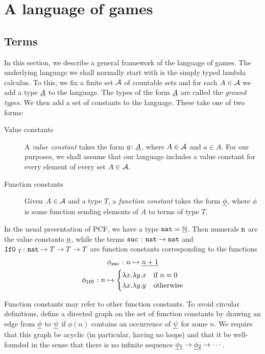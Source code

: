 \documentclass{article}
\begin{document}
\section{A language of games}
\label{sec:game-language}

\subsection{Terms}

In this section, we describe a general framework of the language of games.  
The underlying language we shall normally start with is the simply typed lambda calculus.  
To this, we fix a finite set ${\mathcal{A}}$ of countable sets and for each $A\in{\mathcal{A}}$ we add a type ${\underline{A}}$ to the language.  The types of the form ${\underline{A}}$ are called the \emph{ground types}.
We then add a set of constants to the language.  These take one of two forms:
\begin{description}
  \item[Value constants] A \emph{value constant} takes the form ${\underline{a}}\colon{\underline{A}}$, where $A\in{\mathcal{A}}$ and $a\in A$.  For our purposes, we shall assume that our language includes a value constant for every element of every set $A\in{\mathcal{A}}$.
  \item[Function constants] Given $A\in{\mathcal{A}}$ and a type $T$, a \emph{function constant} takes the form ${\underline{\phi}}$, where $\phi$ is some function sending elements of $A$ to terms of type $T$.
\end{description}

\begin{example}
  In the usual presentation of PCF, we have a type ${\mathtt{nat}}={\underline{\mathbb{N}}}$.  Then numerals ${\mathtt{n}}$ are the value constants ${\underline{n}}$, while the terms ${\mathtt{suc\;}}\colon{\mathtt{nat}}\to{\mathtt{nat}}$ and ${\mathtt{If0}\;}_T\colon{\mathtt{nat}}\to T\to T\to T$ are function constants corresponding to the functions
  \begin{gather*}
    \phi_{\mathtt{suc\;}} \colon n \mapsto {\underline{n + 1}} \\
    \phi_{{\mathtt{If0}\;}} \colon n \mapsto \begin{cases}
      \lambda x . \lambda y . x & \text{if $n=0$} \\
      \lambda x . \lambda y . y & \text{otherwise}
    \end{cases}
  \end{gather*}
\end{example}

\begin{remark}
  Function constants may refer to other function constants.  To avoid circular definitions, define a directed graph on the set of function constants by drawing an edge from ${\underline{\phi}}$ to ${\underline{\psi}}$ if $\phi(n)$ contains an occurrence of ${\underline{\psi}}$ for some $n$.  We require that this graph be acyclic (in particular, having no loops) and that it be well-founded in the sense that there is no infinite sequence ${\underline{\phi_1}} \to {\underline{\phi_2}} \to \cdots$.
\end{remark}
\end{document}
